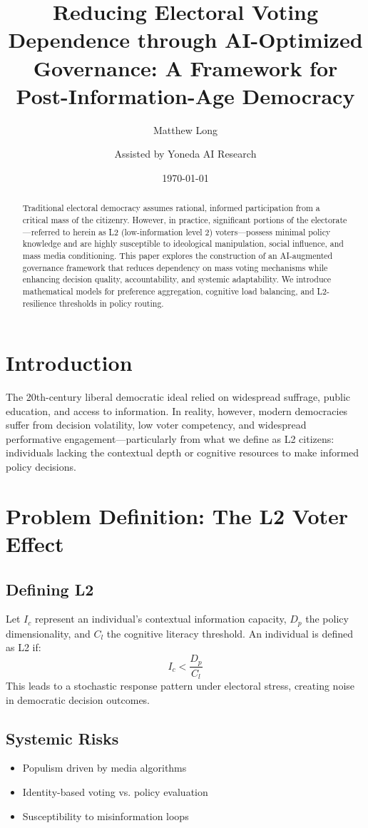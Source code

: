 \documentclass[11pt]{article}
\title{\textbf{Reducing Electoral Voting Dependence through AI-Optimized Governance: A Framework for Post-Information-Age Democracy}}
\author[1]{Matthew Long}
\author[2]{Assisted by Yoneda AI Research}
\affil[1]{Independent Political Systems Analyst}
\affil[2]{AI-Augmented Governance Lab}
\date{\today}
\begin{document}
\maketitle

\begin{abstract}
Traditional electoral democracy assumes rational, informed participation from a critical mass of the citizenry. However, in practice, significant portions of the electorate—referred to herein as L2 (low-information level 2) voters—possess minimal policy knowledge and are highly susceptible to ideological manipulation, social influence, and mass media conditioning. This paper explores the construction of an AI-augmented governance framework that reduces dependency on mass voting mechanisms while enhancing decision quality, accountability, and systemic adaptability. We introduce mathematical models for preference aggregation, cognitive load balancing, and L2-resilience thresholds in policy routing.
\end{abstract}

\section{Introduction}
The 20th-century liberal democratic ideal relied on widespread suffrage, public education, and access to information. In reality, however, modern democracies suffer from decision volatility, low voter competency, and widespread performative engagement—particularly from what we define as L2 citizens: individuals lacking the contextual depth or cognitive resources to make informed policy decisions.

\section{Problem Definition: The L2 Voter Effect}
\subsection{Defining L2}
Let $I_c$ represent an individual's contextual information capacity, $D_p$ the policy dimensionality, and $C_l$ the cognitive literacy threshold. An individual is defined as L2 if:
\begin{equation}
I_c < \frac{D_p}{C_l}
\end{equation}
This leads to a stochastic response pattern under electoral stress, creating noise in democratic decision outcomes.

\subsection{Systemic Risks}
\begin{itemize}
    \item Populism driven by media algorithms
    \item Identity-based voting vs. policy evaluation
    \item Susceptibility to misinformation loops
\end{itemize}
\end{document}
